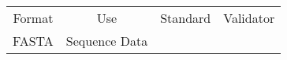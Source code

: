\begin{tabular}{cccc}
{Format} & {Use} & {Standard} & {Validator} \\
FASTA & Sequence Data & 
\end{tabular}